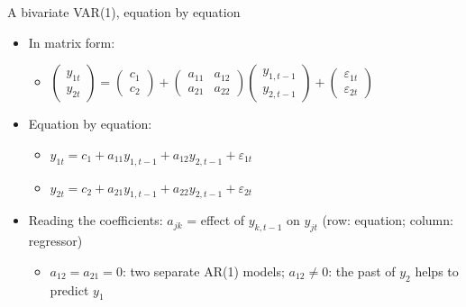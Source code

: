 \begin{frame}{A bivariate VAR(1), equation by equation}
\itemsize{\small}
\begin{itemize}
    \item In matrix form:
    \begin{itemize}
        \item $\begin{pmatrix} y_{1t} \\ y_{2t} \end{pmatrix} = \begin{pmatrix} c_1 \\ c_2 \end{pmatrix} + \begin{pmatrix} a_{11} & a_{12} \\ a_{21} & a_{22} \end{pmatrix}\begin{pmatrix} y_{1,t-1} \\ y_{2,t-1} \end{pmatrix} + \begin{pmatrix} \varepsilon_{1t} \\ \varepsilon_{2t} \end{pmatrix}$
    \end{itemize}
    \item Equation by equation:
    \begin{itemize}
        \item $y_{1t} = c_1 + a_{11}y_{1,t-1} + a_{12}y_{2,t-1} + \varepsilon_{1t}$
        \item $y_{2t} = c_2 + a_{21}y_{1,t-1} + a_{22}y_{2,t-1} + \varepsilon_{2t}$
    \end{itemize}
    \item Reading the coefficients: $a_{jk}$ = effect of $y_{k,t-1}$ on $y_{jt}$ (row: equation; column: regressor)
    \begin{itemize}
        \item $a_{12} = a_{21} = 0$: two separate AR(1) models; $a_{12} \ne 0$: the past of $y_2$ helps to predict $y_1$
    \end{itemize}
\end{itemize}
\end{frame}

